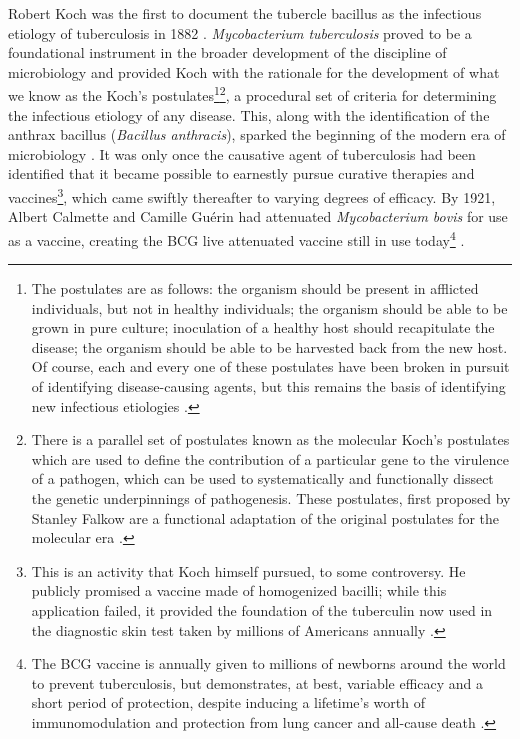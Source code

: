 Robert Koch was the first to document the tubercle bacillus as the infectious etiology of tuberculosis in 1882 \citep{Koch1882, Cambau2014}. \textit{Mycobacterium tuberculosis} proved to be a foundational instrument in the broader development of the discipline of microbiology and provided Koch with the rationale for the development of what we know as the Koch's postulates\footnote{The postulates are as follows: the organism should be present in afflicted individuals, but not in healthy individuals; the organism should be able to be grown in pure culture; inoculation of a healthy host should recapitulate the disease; the organism should be able to be harvested back from the new host. Of course, each and every one of these postulates have been broken in pursuit of identifying disease\hyp{}causing agents, but this remains the basis of identifying new infectious etiologies \citep{Segre2013}.}\footnote{There is a parallel set of postulates known as the molecular Koch's postulates which are used to define the contribution of a particular gene to the virulence of a pathogen, which can be used to systematically and functionally dissect the genetic underpinnings of pathogenesis. These postulates, first proposed by Stanley Falkow are a functional adaptation of the original postulates for the molecular era \citep{Falkow1988, Falkow2004}.}, a procedural set of criteria for determining the infectious etiology of any disease. This, along with the identification of the anthrax bacillus (\textit{Bacillus anthracis}), sparked the beginning of the modern era of microbiology \citep{Koch1876}. It was only once the causative agent of tuberculosis had been identified that it became possible to earnestly pursue curative therapies and vaccines\footnote{This is an activity that Koch himself pursued, to some controversy. He publicly promised a vaccine made of homogenized bacilli; while this application failed, it provided the foundation of the tuberculin now used in the diagnostic skin test taken by millions of Americans annually \citep{Goetz2014}.}, which came swiftly thereafter to varying degrees of efficacy. By 1921, Albert Calmette and Camille Gu\'{e}rin had attenuated \textit{Mycobacterium bovis} for use as a vaccine, creating the BCG live attenuated vaccine still in use today\footnote{The BCG vaccine is annually given to millions of newborns around the world to prevent tuberculosis, but demonstrates, at best, variable efficacy \citep{Schrager2020, Andersen2005, Rodrigues1993, Trauer2021} and a short period of protection, despite inducing a lifetime's worth of immunomodulation and protection from lung cancer and all\hyp{}cause death \citep{Higgins2016}.} \citep{Hawgood2007}. 

